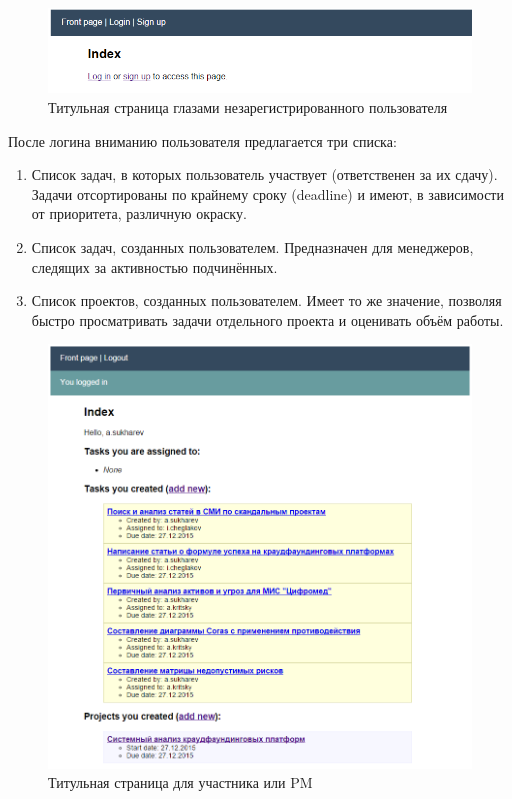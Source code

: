 \documentclass[14pt, a4paper]{extreport}
\begin{document}
\begin{figure}[!htb]
  \centering
    \includegraphics[scale=0.8]{../shared_images/frontend/title-not-logged-in.png}
   \caption{Титульная страница глазами незарегистрированного пользователя}
    \label{fig:start}
\end{figure}

После логина вниманию пользователя предлагается три списка:

\begin{enumerate}
\item Список задач, в которых пользователь участвует (ответственен за их сдачу). Задачи отсортированы по крайнему сроку (deadline) и имеют, в зависимости от приоритета, различную окраску.
\item Список задач, созданных пользователем. Предназначен для менеджеров, следящих за активностью подчинённых.
\item Список проектов, созданных пользователем. Имеет то же значение, позволяя быстро просматривать задачи отдельного проекта и оценивать объём работы.
\end{enumerate}

\begin{figure}[!htb]
  \centering
    \includegraphics[scale=0.6]{../shared_images/frontend/title-logged-in.png}
   \caption{Титульная страница для участника или PM}
    \label{fig:start}
\end{figure}
\end{document}
